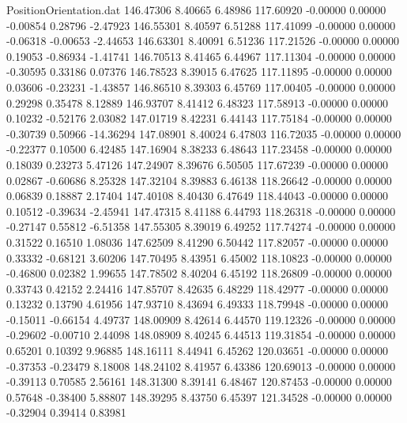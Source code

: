 \begin{filecontents}{PositionOrientation.dat}
 146.47306    8.40665    6.48986   117.60920   -0.00000    0.00000   -0.00854    0.28796   -2.47923
 146.55301    8.40597    6.51288   117.41099   -0.00000    0.00000   -0.06318   -0.00653   -2.44653
 146.63301    8.40091    6.51236   117.21526   -0.00000    0.00000    0.19053   -0.86934   -1.41741
 146.70513    8.41465    6.44967   117.11304   -0.00000    0.00000   -0.30595    0.33186    0.07376
 146.78523    8.39015    6.47625   117.11895   -0.00000    0.00000    0.03606   -0.23231   -1.43857
 146.86510    8.39303    6.45769   117.00405   -0.00000    0.00000    0.29298    0.35478    8.12889
 146.93707    8.41412    6.48323   117.58913   -0.00000    0.00000    0.10232   -0.52176    2.03082
 147.01719    8.42231    6.44143   117.75184   -0.00000    0.00000   -0.30739    0.50966  -14.36294
 147.08901    8.40024    6.47803   116.72035   -0.00000    0.00000   -0.22377    0.10500    6.42485
 147.16904    8.38233    6.48643   117.23458   -0.00000    0.00000    0.18039    0.23273    5.47126
 147.24907    8.39676    6.50505   117.67239   -0.00000    0.00000    0.02867   -0.60686    8.25328
 147.32104    8.39883    6.46138   118.26642   -0.00000    0.00000    0.06839    0.18887    2.17404
 147.40108    8.40430    6.47649   118.44043   -0.00000    0.00000    0.10512   -0.39634   -2.45941
 147.47315    8.41188    6.44793   118.26318   -0.00000    0.00000   -0.27147    0.55812   -6.51358
 147.55305    8.39019    6.49252   117.74274   -0.00000    0.00000    0.31522    0.16510    1.08036
 147.62509    8.41290    6.50442   117.82057   -0.00000    0.00000    0.33332   -0.68121    3.60206
 147.70495    8.43951    6.45002   118.10823   -0.00000    0.00000   -0.46800    0.02382    1.99655
 147.78502    8.40204    6.45192   118.26809   -0.00000    0.00000    0.33743    0.42152    2.24416
 147.85707    8.42635    6.48229   118.42977   -0.00000    0.00000    0.13232    0.13790    4.61956
 147.93710    8.43694    6.49333   118.79948   -0.00000    0.00000   -0.15011   -0.66154    4.49737
 148.00909    8.42614    6.44570   119.12326   -0.00000    0.00000   -0.29602   -0.00710    2.44098
 148.08909    8.40245    6.44513   119.31854   -0.00000    0.00000    0.65201    0.10392    9.96885
 148.16111    8.44941    6.45262   120.03651   -0.00000    0.00000   -0.37353   -0.23479    8.18008
 148.24102    8.41957    6.43386   120.69013   -0.00000    0.00000   -0.39113    0.70585    2.56161
 148.31300    8.39141    6.48467   120.87453   -0.00000    0.00000    0.57648   -0.38400    5.88807
 148.39295    8.43750    6.45397   121.34528   -0.00000    0.00000   -0.32904    0.39414    0.83981

\end{filecontents}
